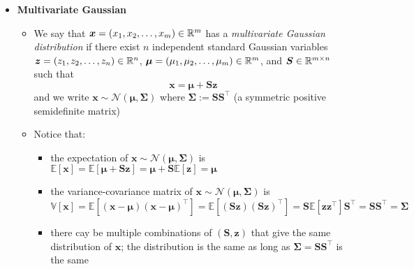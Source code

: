 \documentclass[12pt,a4paper]{article}
\begin{document}
\begin{itemize}

\item \textbf{Multivariate Gaussian}
    
  \begin{itemize}

    \item We say that $\bm{x}=(x_{1},x_{2},\ldots,x_{m})\in\mathbb{R}^{m}$ has a
      \emph{multivariate Gaussian distribution} if there exist
      $n$ independent standard Gaussian variables $\bm{z}=(z_{1}, z_{2},\ldots,z_{n})\in\mathbb{R}^{n}$,
      $\bm{\mu}=(\mu_{1},\mu_{2},\ldots,\mu_{m})\in\mathbb{R}^{m}$,
      and
      $\bm{S}\in\mathbb{R}^{m\times n}$
      such that
      \begin{equation}\label{eq:xmusz}%
        \bm{x} = \bm{\mu} + \bm{S} \bm{z}
      \end{equation}
      and we write $\bm{x}\sim \mathcal{N}(\bm{\mu}, \bm{\Sigma})$
      where $\bm{\Sigma}:=\bm{S}\bm{S}^{\top}$ (a symmetric positive semidefinite matrix)

  \item Notice that:
    \begin{itemize}
    \item the expectation of $\bm{x}\sim\mathcal{N}(\bm{\mu},\bm{\Sigma})$ is
      $\mathbb{E}\left[\bm{x} \right] = \mathbb{E}\left[\bm{\mu} + \bm{S}\bm{z}\right] = \bm{\mu} + \bm{S}\mathbb{E}\left[\bm{z}\right] = \bm{\mu}$
    \item the variance-covariance matrix of $\bm{x}\sim\mathcal{N}(\bm{\mu},\bm{\Sigma})$ is
      \begin{equation}\nonumber%
        \mathbb{V}[\bm{x}]
        =
        \mathbb{E}\left[(\bm{x} - \bm{\mu})(\bm{x} - \bm{\mu})^{\top}\right]
        =
        \mathbb{E}\left[(\bm{S}\bm{z})(\bm{S}\bm{z})^{\top}\right]
        =
        \bm{S}\mathbb{E}\left[\bm{z}\bm{z}^{\top}\right]\bm{S}^{\top}
        =
        \bm{S}\bm{S}^{\top} =\bm{\Sigma}
      \end{equation}
    \item there cay be multiple combinations of $(\bm{S}, \bm{z})$ that give the same distribution of $\bm{x}$;
      the distribution is the same as long as $\bm{\Sigma}=\bm{S}\bm{S}^{\top}$ is the same
    \end{itemize}


\end{itemize}
\end{itemize}
\end{document}
